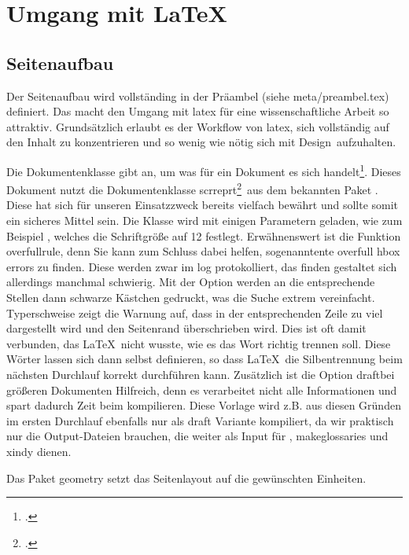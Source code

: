 \newpage

\section{Umgang mit \protect\LaTeX{}}%
\label{sec:umgang}
\subsection{Seitenaufbau}%
\label{sec:seit-aufbau}
Der Seitenaufbau wird vollständing in der Präambel (siehe meta/preambel.tex) definiert. Das macht den Umgang mit \gls{latex} für eine wissenschaftliche Arbeit so attraktiv. Grundsätzlich erlaubt es der Workflow von \gls{latex}, sich vollständig auf den Inhalt zu konzentrieren und so wenig wie nötig sich mit \glqq Design\grqq\ aufzuhalten.

Die Dokumentenklasse gibt an, um was für ein Dokument es sich handelt\footcite[Vgl. ][S. 9]{oetiker_not_2018}. Dieses Dokument nutzt die Dokumentenklasse \glqq scrreprt\grqq\footcite[S. 51]{kohm_koma_2019}\ aus dem bekannten Paket . Diese hat sich für unseren Einsatzzweck bereits vielfach bewährt und sollte somit ein sicheres Mittel sein.
Die Klasse wird mit einigen Parametern geladen, wie zum Beispiel \glqq 12pt\grqq, welches die Schriftgröße auf 12 festlegt. Erwähnenswert ist die Funktion \glqq overfullrule\grqq, denn Sie kann zum Schluss dabei helfen, sogenanntente overfull hbox errors zu finden. Diese werden zwar im log protokolliert, das finden gestaltet sich allerdings manchmal schwierig. Mit der Option werden an die entsprechende Stellen dann schwarze Kästchen gedruckt, was die Suche extrem vereinfacht. Typerschweise zeigt die Warnung auf, dass
in der entsprechenden Zeile zu viel dargestellt wird und den Seitenrand überschrieben wird. Dies ist oft damit verbunden, das \LaTeX{}\ nicht wusste, wie es das Wort richtig trennen soll. Diese Wörter lassen sich dann selbst definieren, so dass \LaTeX{}\ die Silbentrennung beim nächsten Durchlauf korrekt durchführen kann.
Zusätzlich ist die Option \glqq draft\grqq bei größeren Dokumenten Hilfreich, denn es verarbeitet nicht alle Informationen und spart dadurch Zeit beim kompilieren. Diese Vorlage wird z.B. aus diesen Gründen im ersten Durchlauf ebenfalls nur als draft Variante kompiliert, da wir praktisch nur die Output-Dateien brauchen, die weiter als Input für , makeglossaries und xindy dienen.

Das Paket geometry setzt das Seitenlayout auf die gewünschten Einheiten.

